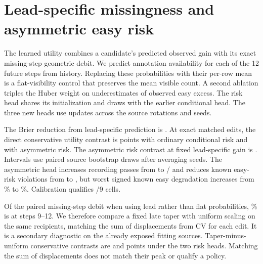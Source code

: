 \section{Lead-specific missingness and asymmetric easy risk}
The learned utility combines a candidate's predicted observed gain
with its exact missing-step geometric debit. We predict annotation
availability for each of the 12 future steps from history. Replacing
these probabilities with their per-row mean is a flat-visibility
control that preserves the mean visible count. A second ablation
triples the Huber weight on underestimates of observed easy excess.
The risk head shares its initialization and draws with the earlier
conditional head. The three new heads use \LeadRiskAblUpdates{} updates
across the source rotations and seeds.

The Brier reduction from lead-specific prediction is \LeadRiskAblBrier{}.
At \LeadRiskAblEdits{} exact matched edits, the direct conservative
utility contrast is \LeadRiskAblLead{} points with ordinary conditional
risk and \LeadRiskAblTailLead{} with asymmetric risk. The asymmetric
risk contrast at fixed lead-specific gain is \LeadRiskAblTail{}.
Intervals use paired source bootstrap draws after averaging seeds.
The asymmetric head increases recording passes from \LeadRiskAblBasePass{}
to \LeadRiskAblTailPass{}/\LeadRiskAblViews{} and reduces known easy-risk
violations from \LeadRiskAblBaseEasy{} to \LeadRiskAblTailEasy{}, but
worst signed known easy degradation increases from
\LeadRiskAblBaseWorst{}\% to \LeadRiskAblTailWorst{}\%.
Calibration qualifies \LeadRiskAblQual{}/9 cells.

Of the paired missing-step debit when using lead rather than flat
probabilities, \LeadRiskAblLateShare{}\% is at steps 9--12. We therefore
compare a fixed late taper with uniform scaling on the same recipients,
matching the sum of displacements from CV for each edit. It is a
secondary diagnostic on the already exposed fitting sources.
Taper-minus-uniform conservative contrasts are \LeadRiskAblTaperCond{}
and \LeadRiskAblTaperTail{} points under the two risk heads. Matching
the sum of displacements does not match their peak or qualify a policy.
